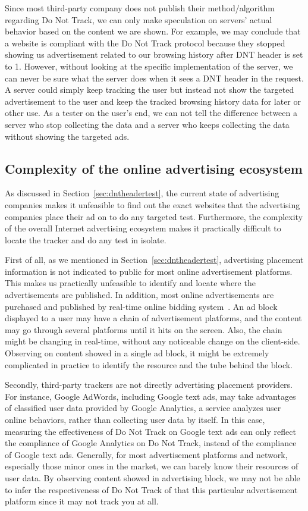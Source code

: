\documentclass{sig-alternate}
\begin{document}
Since most third-party company does not publish their method/algorithm regarding Do Not Track, we can only make speculation on servers' actual behavior based on the content we are shown. For example, we may conclude that a website is compliant with the Do Not Track protocol because they stopped showing us advertisement related to our browsing history after DNT header is set to 1. However, without looking at the specific implementation of the server, we can never be sure what the server does when it sees a DNT header in the request. A server could simply keep tracking the user but instead not show the targeted advertisement to the user and keep the tracked browsing history data for later or other use. As a tester on the user’s end, we can not tell the difference between a server who stop collecting the data and a server who keeps collecting the data without showing the targeted ads. 

\subsection{Complexity of the online advertising ecosystem} \label{sec:complexity}

As discussed in Section~\ref{sec:dntheadertest}, the current state of advertising companies makes it unfeasible to find out the exact websites that the advertising companies place their ad on to do any targeted test. Furthermore, the complexity of the overall Internet advertising ecosystem makes it practically difficult to locate the tracker and do any test in isolate. 

First of all, as we mentioned in Section~\ref{sec:dntheadertest}, advertising placement information is not indicated to public for most online advertisement platforms. This makes us practically unfeasible to identify and locate where the advertisements are published. In addition, most online advertisements are purchased and published by real-time online bidding system~\cite{mayer2012third}. An ad block displayed to a user may have a chain of advertisement platforms, and the content may go through several platforms until it hits on the screen. Also, the chain might be changing in real-time, without any noticeable change on the client-side. Observing on content showed in a single ad block, it might be extremely complicated in practice to identify the resource and the tube behind the block.

Secondly, third-party trackers are not directly advertising placement providers. For instance, Google AdWords, including Google text ads, may take advantages of classified user data provided by Google Analytics, a service analyzes user online behaviors, rather than collecting user data by itself. In this case, measuring the effectiveness of Do Not Track on Google text ads can only reflect the compliance of Google Analytics on Do Not Track, instead of the compliance of Google text ads. Generally, for most advertisement platforms and network, especially those minor ones in the market, we can barely know their resources of user data. By observing content showed in advertising block, we may not be able to infer the respectiveness of Do Not Track of that this particular advertisement platform since it may not track you at all.
\end{document}

